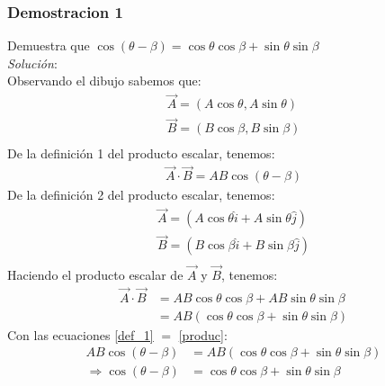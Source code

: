 \documentclass[12pt,openany]{book}
\begin{document}
			\subsubsection{Demostracion 1}
				\noindent Demuestra que $\cos(\theta-\beta)=\cos\theta\cos\beta+\sin\theta\sin\beta$\\
				\noindent\textsl{Soluci\'on}:\\
				Observando el dibujo sabemos que:
				\begin{equation}
					\begin{split}
						\vec{A}=(A\cos\theta,A\sin\theta)\\
						\vec{B}=(B\cos\beta,B\sin\beta)\\
					\end{split}
				\end{equation}
				De la definici\'on 1 del producto escalar, tenemos:\\
				\begin{equation}
					\begin{split}
						\vec{A}\cdot\vec{B}=AB\cos(\theta-\beta)
						\label{def_1}
					\end{split}
				\end{equation}
				De la definici\'on 2 del producto escalar, tenemos:\\
				\begin{equation*}
					\begin{split}
						\vec{A}=(A\cos\theta\hat{i} + A\sin\theta\hat{j})\\
						\vec{B}=(B\cos\beta\hat{i} + B\sin\beta\hat{j})\\
					\end{split}
				\end{equation*}
				Haciendo el producto escalar de $\vec{A}$ y $\vec{B}$, tenemos:
				\begin{equation}
					\begin{split}
						\vec{A}\cdot\vec{B}&=AB\cos\theta\cos\beta + AB\sin\theta\sin\beta\\
						 										 &=AB(\cos\theta\cos\beta + \sin\theta\sin\beta)
						\label{produc}
					\end{split}
				\end{equation}
				Con las ecuaciones \ref{def_1} $=$ \ref{produc}:
				\begin{equation*}
					\begin{split}
						AB\cos(\theta-\beta) &=AB(\cos\theta\cos\beta + \sin\theta\sin\beta)\\
						\Rightarrow \cos(\theta-\beta) &=\cos\theta\cos\beta + \sin\theta\sin\beta
					\end{split}
				\end{equation*}
\end{document}
